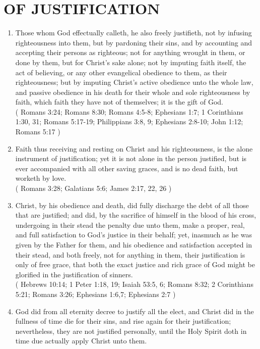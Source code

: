 \documentclass[12pt,a4paper]{book}
\begin{document}
\chapter{OF JUSTIFICATION}
\label{ch-justif}
\begin{enumerate}
\item Those whom God effectually calleth, he also freely justifieth, not by infusing righteousness into them, but by pardoning their sins, and by accounting and accepting their persons as righteous; not for anything wrought in them, or done by them, but for Christ's sake alone; not by imputing faith itself, the act of believing, or any other evangelical obedience to them, as their righteousness; but by imputing Christ's active obedience unto the whole law, and passive obedience in his death for their whole and sole righteousness by faith, which faith they have not of themselves; it is the gift of God.\\
( Romans 3:24; Romans 8:30; Romans 4:5-8; Ephesians 1:7; 1 Corinthians 1:30, 31; Romans 5:17-19; Philippians 3:8, 9; Ephesians 2:8-10; John 1:12; Romans 5:17 )
\item Faith thus receiving and resting on Christ and his righteousness, is the alone instrument of justification; yet it is not alone in the person justified, but is ever accompanied with all other saving graces, and is no dead faith, but worketh by love.\\
( Romans 3:28; Galatians 5:6; James 2:17, 22, 26 )
\item Christ, by his obedience and death, did fully discharge the debt of all those that are justified; and did, by the sacrifice of himself in the blood of his cross, undergoing in their stead the penalty due unto them, make a proper, real, and full satisfaction to God's justice in their behalf; yet, inasmuch as he was given by the Father for them, and his obedience and satisfaction accepted in their stead, and both freely, not for anything in them, their justification is only of free grace, that both the exact justice and rich grace of God might be glorified in the justification of sinners.\\
( Hebrews 10:14; 1 Peter 1:18, 19; Isaiah 53:5, 6; Romans 8:32; 2 Corinthians 5:21; Romans 3:26; Ephesians 1:6,7; Ephesians 2:7 )
\item God did from all eternity decree to justify all the elect, and Christ did in the fullness of time die for their sins, and rise again for their justification; nevertheless, they are not justified personally, until the Holy Spirit doth in time due actually apply Christ unto them.\\

\end{enumerate}
\end{document}
